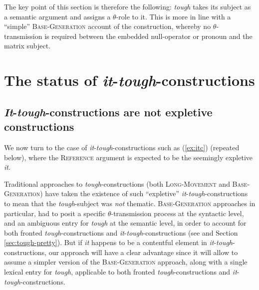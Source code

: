 \documentclass[11pt]{article}
\begin{document}
The key point of this section is therefore the following: \textit{tough} takes its subject as a semantic argument and assigns a $\theta$-role to it. This is more in line with a ``simple'' \textsc{Base-Generation} account of the construction, whereby no $\theta$-transmission is required between the embedded null-operator or pronoun and the matrix subject. 



\section{The status of \textit{it}-\textit{tough}-constructions}\label{sec:it-not-expletive}
\subsection{\textit{It}-\textit{tough}-constructions are not expletive constructions}
We now turn to the case of \textit{it}-\textit{tough}-constructions such as (\ref{ex:itc}) (repeated below), where the \textsc{Reference} argument is expected to be the seemingly expletive \textit{it}.
\begin{exe}
\end{exe}

Traditional approaches to \textit{tough}-constructions (both \textsc{Long-Movement} and \textsc{Base-Generation}) have taken the existence of such ``expletive'' \textit{it}-\textit{tough}-constructions to mean that the \textit{tough}-subject was \textit{not} thematic. \textsc{Base-Generation} approaches in particular, had to posit a specific $\theta$-transmission process at the syntactic level, and an ambiguous entry for \textit{tough} at the semantic level, in order to account for both fronted \textit{tough}-constructions and \textit{it}-\textit{tough}-constructions (see \cite{Keine2017} and Section \ref{sec:tough-pretty}). But if \textit{it} happens to be a contentful element in \textit{it}-\textit{tough}-constructions, our approach will have a clear advantage since it will allow to assume a simpler version of the \textsc{Base-Generation} approach, along with a single lexical entry for \textit{tough}, applicable to both fronted \textit{tough}-constructions and \textit{it}-\textit{tough}-constructions.\\
\end{document}
